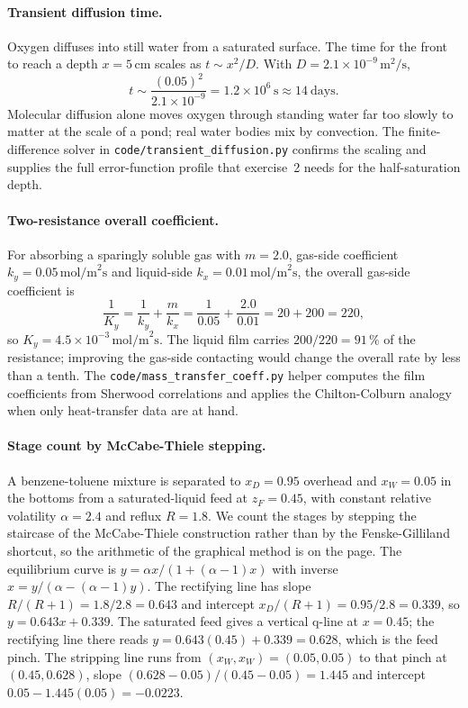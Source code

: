 \paragraph{Transient diffusion time.} Oxygen diffuses into still water
from a saturated surface. The time for the front to reach a depth
$x = 5\,\si{\centi\meter}$ scales as $t \sim x^2/D$. With $D =
2.1\times 10^{-9}\,\si{\meter\squared\per\second}$,
\[
t \sim \frac{(0.05)^2}{2.1\times 10^{-9}} = 1.2\times 10^{6}\,\text{s}
\approx 14\ \text{days}.
\]
Molecular diffusion alone moves oxygen through standing water far too
slowly to matter at the scale of a pond; real water bodies mix by
convection. The finite-difference solver in
\texttt{code/transient\_diffusion.py} confirms the scaling and supplies
the full error-function profile that exercise~2 needs for the
half-saturation depth.

\paragraph{Two-resistance overall coefficient.} For absorbing a
sparingly soluble gas with $m = 2.0$, gas-side coefficient $k_y =
0.05\,\text{mol/m}^2\text{s}$ and liquid-side $k_x = 0.01\,\text{mol/m}
^2\text{s}$, the overall gas-side coefficient is
\[
\frac{1}{K_y} = \frac{1}{k_y} + \frac{m}{k_x} = \frac{1}{0.05} +
\frac{2.0}{0.01} = 20 + 200 = 220,
\]
so $K_y = 4.5\times 10^{-3}\,\text{mol/m}^2\text{s}$. The liquid film
carries $200/220 = 91\,\%$ of the resistance; improving the gas-side
contacting would change the overall rate by less than a tenth. The
\texttt{code/mass\_transfer\_coeff.py} helper computes the film
coefficients from Sherwood correlations and applies the
Chilton-Colburn analogy when only heat-transfer data are at hand.

\paragraph{Stage count by McCabe-Thiele stepping.} A benzene-toluene
mixture is separated to $x_D = 0.95$ overhead and $x_W = 0.05$ in the
bottoms from a saturated-liquid feed at $z_F = 0.45$, with constant
relative volatility $\alpha = 2.4$ and reflux $R = 1.8$. We count the
stages by stepping the staircase of the McCabe-Thiele construction
rather than by the Fenske-Gilliland shortcut, so the arithmetic of the
graphical method is on the page. The equilibrium curve is $y = \alpha
x/(1+(\alpha-1)x)$ with inverse $x = y/(\alpha-(\alpha-1)y)$. The
rectifying line has slope $R/(R+1) = 1.8/2.8 = 0.643$ and intercept
$x_D/(R+1) = 0.95/2.8 = 0.339$, so $y = 0.643x + 0.339$. The saturated
feed gives a vertical q-line at $x = 0.45$; the rectifying line there
reads $y = 0.643(0.45)+0.339 = 0.628$, which is the feed pinch. The
stripping line runs from $(x_W,x_W) = (0.05,0.05)$ to that pinch at
$(0.45,0.628)$, slope $(0.628-0.05)/(0.45-0.05) = 1.445$ and intercept
$0.05-1.445(0.05) = -0.0223$.

